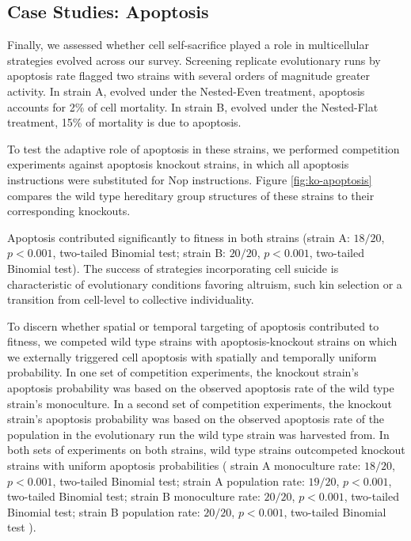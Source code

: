 \subsection{Case Studies: Apoptosis} \label{sec:apoptosis}



Finally, we assessed whether cell self-sacrifice played a role in multicellular strategies evolved across our survey.
Screening replicate evolutionary runs by apoptosis rate flagged two strains with several orders of magnitude greater activity.
In strain A, evolved under the Nested-Even treatment, apoptosis accounts for 2\% of cell mortality.
In strain B, evolved under the Nested-Flat treatment, 15\% of mortality is due to apoptosis.

To test the adaptive role of apoptosis in these strains, we performed competition experiments against apoptosis knockout strains, in which all apoptosis instructions were substituted for Nop instructions.
Figure \ref{fig:ko-apoptosis} compares the wild type hereditary group structures of these strains to their corresponding knockouts.

Apoptosis contributed significantly to fitness in both strains (strain A: $18/20$, $p < 0.001$, two-tailed Binomial test; strain B: $20/20$, $p < 0.001$, two-tailed Binomial test).
The success of strategies incorporating cell suicide is characteristic of evolutionary conditions favoring altruism, such kin selection or a transition from cell-level to collective individuality.

To discern whether spatial or temporal targeting of apoptosis contributed to fitness, we competed wild type strains with apoptosis-knockout strains on which we externally triggered cell apoptosis with spatially and temporally uniform probability.
In one set of competition experiments, the knockout strain's apoptosis probability was based on the observed apoptosis rate of the wild type strain's monoculture.
In a second set of competition experiments, the knockout strain's apoptosis probability was based on the observed apoptosis rate of the population in the evolutionary run the wild type strain was harvested from.
In both sets of experiments on both strains, wild type strains outcompeted knockout strains with uniform apoptosis probabilities
(%
strain A \@ monoculture rate: $18/20$, $p < 0.001$, two-tailed Binomial test;
strain A \@ population rate: $19/20$, $p < 0.001$, two-tailed Binomial test;
strain B \@ monoculture rate: $20/20$, $p < 0.001$, two-tailed Binomial test;
strain B \@ population rate: $20/20$, $p < 0.001$, two-tailed Binomial test%
). %
